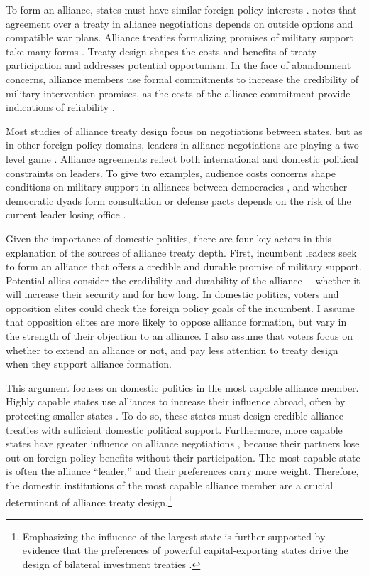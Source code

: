 \documentclass[12pt]{article}
\begin{document}
To form an alliance, states must have similar foreign policy interests \citep{Morrow1991, Smith1995, FordhamPoast2014}. 
\citet{Poast2019a} notes that agreement over a treaty in alliance negotiations depends on outside options and compatible war plans. 
Alliance treaties formalizing promises of military support take many forms \citep{Leedsetal2002, BensonClinton2016}. 
Treaty design shapes the costs and benefits of treaty participation and addresses potential opportunism.  
In the face of abandonment concerns, alliance members use formal commitments to increase the credibility of military intervention promises, as the costs of the alliance commitment provide indications of reliability \citep{Morrow2000}.


Most studies of alliance treaty design focus on negotiations between states, but as in other foreign policy domains, leaders in alliance negotiations are playing a two-level game \citep{Putnam1988}. 
Alliance agreements reflect both international and domestic political constraints on leaders. 
To give two examples, audience costs concerns shape conditions on military support in alliances between democracies \citep{Chibaetal2015, FjelstulReiter2019}, and whether democratic dyads form consultation or defense pacts depends on the risk of the current leader losing office \citep{Mattes2012a}. 


Given the importance of domestic politics, there are four key actors in this explanation of the sources of alliance treaty depth. 
First, incumbent leaders seek to form an alliance that offers a credible and durable promise of military support. 
Potential allies consider the credibility and durability of the alliance--- whether it will increase their security and for how long. 
In domestic politics, voters and opposition elites could check the foreign policy goals of the incumbent. 
I assume that opposition elites are more likely to oppose alliance formation, but vary in the strength of their objection to an alliance. 
I also assume that voters focus on whether to extend an alliance or not, and pay less attention to treaty design when they support alliance formation.


This argument focuses on domestic politics in the most capable alliance member. 
Highly capable states use alliances to increase their influence abroad, often by protecting smaller states \citep{Morrow1994}. 
To do so, these states must design credible alliance treaties with sufficient domestic political support.
Furthermore, more capable states have greater influence on alliance negotiations \citep{Mattes2012}, because their partners lose out on foreign policy benefits without their participation.
The most capable state is often the alliance ``leader,'' and their preferences carry more weight. 
Therefore, the domestic institutions of the most capable alliance member are a crucial determinant of alliance treaty design.\footnote{Emphasizing the influence of the largest state is further supported by evidence that the preferences of powerful capital-exporting states drive the design of bilateral investment treaties \citep{AlleePeinhardt2014}.} 
\end{document}
